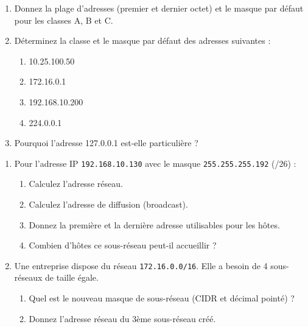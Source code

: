 \documentclass[11pt]{article}
\begin{document}
\begin{exercice}
\begin{enumerate}
    \item Donnez la plage d'adresses (premier et dernier octet) et le masque par défaut pour les classes A, B et C.
    \item Déterminez la classe et le masque par défaut des adresses suivantes :
    \begin{enumerate}
        \item 10.25.100.50
        \item 172.16.0.1
        \item 192.168.10.200
        \item 224.0.0.1
    \end{enumerate}
    \item Pourquoi l'adresse 127.0.0.1 est-elle particulière ?
\end{enumerate}
\end{exercice}

\begin{exercice}
\begin{enumerate}
    \item Pour l'adresse IP \texttt{192.168.10.130} avec le masque \texttt{255.255.255.192} (/26) :
    \begin{enumerate}
        \item Calculez l'adresse réseau.
        \item Calculez l'adresse de diffusion (broadcast).
        \item Donnez la première et la dernière adresse utilisables pour les hôtes.
        \item Combien d'hôtes ce sous-réseau peut-il accueillir ?
    \end{enumerate}
    \item Une entreprise dispose du réseau \texttt{172.16.0.0/16}. Elle a besoin de 4 sous-réseaux de taille égale.
    \begin{enumerate}
        \item Quel est le nouveau masque de sous-réseau (CIDR et décimal pointé) ?
        \item Donnez l'adresse réseau du 3ème sous-réseau créé.
    \end{enumerate}
\end{enumerate}
\end{exercice}
\end{document}
